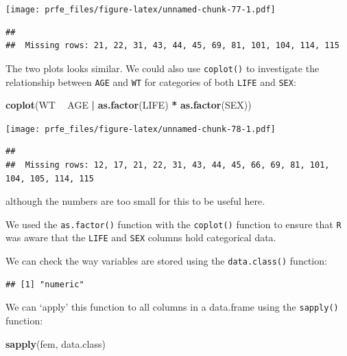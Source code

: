 \documentclass[]{book}
\newenvironment{Shaded}{\begin{snugshade}}{\end{snugshade}}
\newcommand{\KeywordTok}[1]{\textcolor[rgb]{0.13,0.29,0.53}{\textbf{#1}}}
\newcommand{\StringTok}[1]{\textcolor[rgb]{0.31,0.60,0.02}{#1}}
\newcommand{\OperatorTok}[1]{\textcolor[rgb]{0.81,0.36,0.00}{\textbf{#1}}}
\newcommand{\NormalTok}[1]{#1}
\theoremstyle{definition}
\theoremstyle{definition}
\theoremstyle{definition}
\theoremstyle{remark}
\begin{document}
\texttt{[image: prfe\_files/figure-latex/unnamed-chunk-77-1.pdf]}

\begin{verbatim}
## 
##  Missing rows: 21, 22, 31, 43, 44, 45, 69, 81, 101, 104, 114, 115
\end{verbatim}

The two plots looks similar. We could also use \texttt{coplot()} to
investigate the relationship between \texttt{AGE} and \texttt{WT} for
categories of both \texttt{LIFE} and \texttt{SEX}:

\begin{Shaded}
\begin{Highlighting}[]
\KeywordTok{coplot}\NormalTok{(WT }\OperatorTok{~}\StringTok{ }\NormalTok{AGE }\OperatorTok{|}\StringTok{ }\KeywordTok{as.factor}\NormalTok{(LIFE) }\OperatorTok{*}\StringTok{ }\KeywordTok{as.factor}\NormalTok{(SEX))}
\end{Highlighting}
\end{Shaded}

\texttt{[image: prfe\_files/figure-latex/unnamed-chunk-78-1.pdf]}

\begin{verbatim}
## 
##  Missing rows: 12, 17, 21, 22, 31, 43, 44, 45, 66, 69, 81, 101, 104, 105, 114, 115
\end{verbatim}

although the numbers are too small for this to be useful here.

We used the \texttt{as.factor()} function with the \texttt{coplot()}
function to ensure that \texttt{R} was aware that the \texttt{LIFE} and
\texttt{SEX} columns hold categorical data.

We can check the way variables are stored using the
\texttt{data.class()} function:

\begin{Shaded}
\end{Shaded}

\begin{verbatim}
## [1] "numeric"
\end{verbatim}

We can `apply' this function to all columns in a data.frame using the
\texttt{sapply()} function:

\begin{Shaded}
\begin{Highlighting}[]
\KeywordTok{sapply}\NormalTok{(fem, data.class)}
\end{Highlighting}
\end{Shaded}
\end{document}
